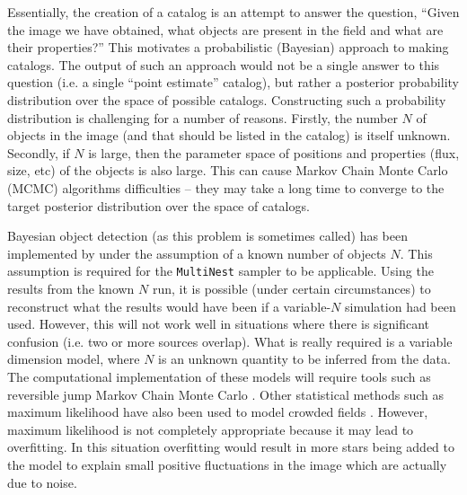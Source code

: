 \documentclass[manuscript]{aastex}
\begin{document}
Essentially, the creation of a catalog is an attempt to answer the question,
``Given the image we have obtained, what objects are present in the field and
what are their properties?'' This motivates a probabilistic (Bayesian)
approach to making catalogs. The output of such an approach would not be a
single answer to this question (i.e. a single ``point estimate'' catalog), but rather a posterior probability distribution over the space of possible catalogs.
Constructing such a probability distribution is
challenging for a number of reasons. Firstly, the number $N$ of objects in the
image (and that should be listed in the catalog) is itself unknown. Secondly, if $N$ is large, then the parameter space
of positions and properties (flux, size, etc) of the objects is also large.
This can cause Markov Chain Monte Carlo (MCMC) algorithms difficulties -- they
may take a long time to converge to the target posterior distribution over
the space of catalogs.

Bayesian object detection (as this problem is sometimes called) has been
implemented by \citet{2011MNRAS.415.3462F}
under the assumption of a known number of objects $N$.
This assumption is required for the
{\tt MultiNest} sampler \citep{multinest} to be applicable.
Using the results from the known $N$
run, it is possible (under certain circumstances) to reconstruct what the
results would have been if a variable-$N$ simulation had been used. However,
this will not work well in situations where there is significant confusion
(i.e. two or more sources overlap). What is really required is a variable
dimension model, where $N$ is an unknown quantity to be inferred from the data.
The computational implementation of these models will require tools such as
reversible jump Markov Chain Monte Carlo \citep{rjmcmc}. Other statistical
methods such as maximum likelihood have also been used to model crowded fields
\citep[e.g.][]{irwin}. However, maximum likelihood is not completely appropriate
because it may lead to overfitting. In this situation overfitting would result
in more stars being added to the model to explain small positive fluctuations
in the image which are actually due to noise.
\end{document}
